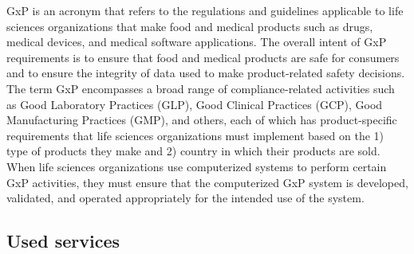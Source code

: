 GxP is an acronym that refers to the regulations and guidelines applicable to life sciences organizations that make food and medical products such as drugs, medical devices, and medical software applications. The overall intent of GxP requirements is to ensure that food and medical products are safe for consumers and to ensure the integrity of data used to make product-related safety decisions. The term GxP encompasses a broad range of compliance-related activities such as Good Laboratory Practices (GLP), Good Clinical Practices (GCP), Good Manufacturing Practices (GMP), and others, each of which has product-specific requirements that life sciences organizations must implement based on the 1) type of products they make and 2) country in which their products are sold. When life sciences organizations use computerized systems to perform certain GxP activities, they must ensure that the computerized GxP system is developed, validated, and operated appropriately for the intended use of the system. \cite{GxPCompliance}

\subsection{Used services}
